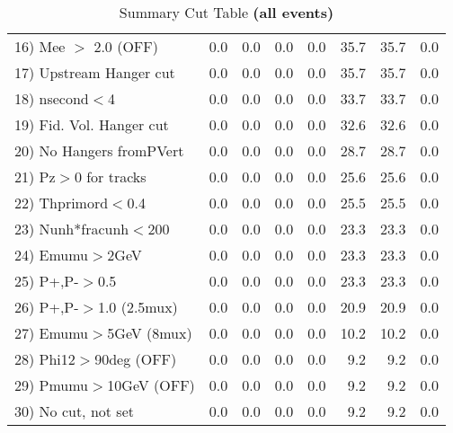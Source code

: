 \begin{table}[h!]
{{\begin{tabular}{||l||r|r|r|r|r||r||r||}
 16) Mee $>$ 2.0  (OFF)   &       0.0 &       0.0 &       0.0 &       0.0 &      35.7 &      35.7 &       0.0 \\
 17) Upstream Hanger cut  &       0.0 &       0.0 &       0.0 &       0.0 &      35.7 &      35.7 &       0.0 \\
 18) nsecond$<$4          &       0.0 &       0.0 &       0.0 &       0.0 &      33.7 &      33.7 &       0.0 \\
 19) Fid. Vol. Hanger cut &       0.0 &       0.0 &       0.0 &       0.0 &      32.6 &      32.6 &       0.0 \\
 20) No Hangers fromPVert &       0.0 &       0.0 &       0.0 &       0.0 &      28.7 &      28.7 &       0.0 \\
 21) Pz$>$0 for tracks    &       0.0 &       0.0 &       0.0 &       0.0 &      25.6 &      25.6 &       0.0 \\
 22) Thprimord$<$0.4      &       0.0 &       0.0 &       0.0 &       0.0 &      25.5 &      25.5 &       0.0 \\
 23) Nunh*fracunh$<$200   &       0.0 &       0.0 &       0.0 &       0.0 &      23.3 &      23.3 &       0.0 \\
 24) Emumu$>$2GeV         &       0.0 &       0.0 &       0.0 &       0.0 &      23.3 &      23.3 &       0.0 \\
 25) P+,P-$>$0.5          &       0.0 &       0.0 &       0.0 &       0.0 &      23.3 &      23.3 &       0.0 \\
 26) P+,P-$>$1.0 (2.5mux) &       0.0 &       0.0 &       0.0 &       0.0 &      20.9 &      20.9 &       0.0 \\
 27) Emumu$>$5GeV  (8mux) &       0.0 &       0.0 &       0.0 &       0.0 &      10.2 &      10.2 &       0.0 \\
 28) Phi12$>$90deg  (OFF) &       0.0 &       0.0 &       0.0 &       0.0 &       9.2 &       9.2 &       0.0 \\
 29) Pmumu$>$10GeV  (OFF) &       0.0 &       0.0 &       0.0 &       0.0 &       9.2 &       9.2 &       0.0 \\
 30) No cut, not set      &       0.0 &       0.0 &       0.0 &       0.0 &       9.2 &       9.2 &       0.0 \\
 \hline
 \hline
 \end{tabular}
 \caption{Summary Cut Table \textbf{ (all events)}}
 \label{tab-sumcut}
 }}
 \end{table}
 \endinput
